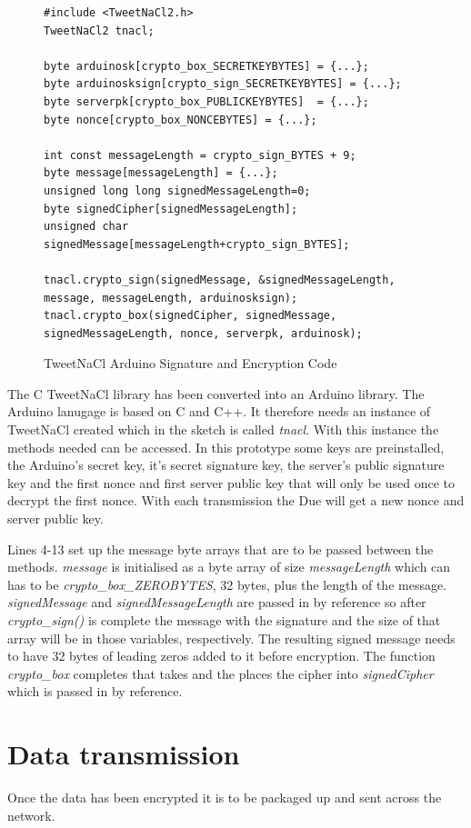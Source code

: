 \begin{figure}[H]
\begin{lstlisting}[style=Arduino]
#include <TweetNaCl2.h>
TweetNaCl2 tnacl;

byte arduinosk[crypto_box_SECRETKEYBYTES] = {...};
byte arduinosksign[crypto_sign_SECRETKEYBYTES] = {...};
byte serverpk[crypto_box_PUBLICKEYBYTES]  = {...};
byte nonce[crypto_box_NONCEBYTES] = {...};

int const messageLength = crypto_sign_BYTES + 9;
byte message[messageLength] = {...};
unsigned long long signedMessageLength=0;
byte signedCipher[signedMessageLength];
unsigned char signedMessage[messageLength+crypto_sign_BYTES];

tnacl.crypto_sign(signedMessage, &signedMessageLength, message, messageLength, arduinosksign);
tnacl.crypto_box(signedCipher, signedMessage, signedMessageLength, nonce, serverpk, arduinosk);
\end{lstlisting}
\caption{TweetNaCl Arduino Signature and Encryption Code}
\label{snip:nacl}
\end{figure}

The C TweetNaCl library has been converted into an Arduino library. The Arduino lanugage is based on C and C++. It therefore needs an instance of TweetNaCl created which in the sketch is called \emph{tnacl}. With this instance the methods needed can be accessed. In this prototype some keys are preinstalled, the Arduino's secret key, it's secret signature key, the server's public signature key and the first nonce and first server public key that will only be used once to decrypt the first nonce. With each transmission the Due will get a new nonce and server public key. 

Lines 4-13 set up the message byte arrays that are to be passed between the methods. \emph{message} is initialised as a byte array of size \emph{messageLength} which can has to be \emph{crypto\_box\_ZEROBYTES}, 32 bytes, plus the length of the message. \emph{signedMessage} and \emph{signedMessageLength} are passed in by reference so after \emph{crypto\_sign()} is complete the message with the signature and the size of that array will be in those variables, respectively. The resulting signed message needs to have 32 bytes of leading zeros added to it before encryption. The function \emph{crypto\_box} completes that takes and the places the cipher into \emph{signedCipher} which is passed in by reference. 

\clearpage

\section{Data transmission}
Once the data has been encrypted it is to be packaged up and sent across the network.

